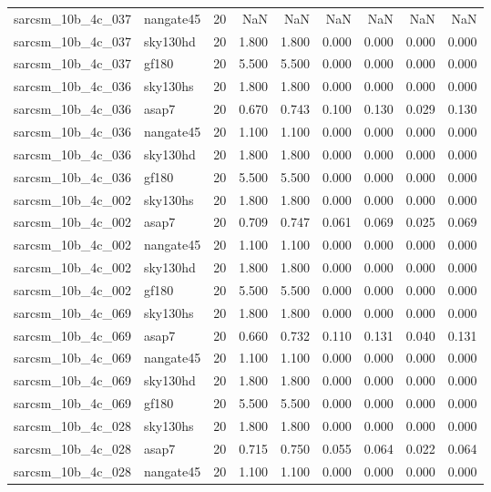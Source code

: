 \begin{tabular}{llrrrrrrr}
sarcsm\_10b\_4c\_037 & nangate45 & 20 & NaN & NaN & NaN & NaN & NaN & NaN \\
sarcsm\_10b\_4c\_037 & sky130hd & 20 & 1.800 & 1.800 & 0.000 & 0.000 & 0.000 & 0.000 \\
sarcsm\_10b\_4c\_037 & gf180 & 20 & 5.500 & 5.500 & 0.000 & 0.000 & 0.000 & 0.000 \\
sarcsm\_10b\_4c\_036 & sky130hs & 20 & 1.800 & 1.800 & 0.000 & 0.000 & 0.000 & 0.000 \\
sarcsm\_10b\_4c\_036 & asap7 & 20 & 0.670 & 0.743 & 0.100 & 0.130 & 0.029 & 0.130 \\
sarcsm\_10b\_4c\_036 & nangate45 & 20 & 1.100 & 1.100 & 0.000 & 0.000 & 0.000 & 0.000 \\
sarcsm\_10b\_4c\_036 & sky130hd & 20 & 1.800 & 1.800 & 0.000 & 0.000 & 0.000 & 0.000 \\
sarcsm\_10b\_4c\_036 & gf180 & 20 & 5.500 & 5.500 & 0.000 & 0.000 & 0.000 & 0.000 \\
sarcsm\_10b\_4c\_002 & sky130hs & 20 & 1.800 & 1.800 & 0.000 & 0.000 & 0.000 & 0.000 \\
sarcsm\_10b\_4c\_002 & asap7 & 20 & 0.709 & 0.747 & 0.061 & 0.069 & 0.025 & 0.069 \\
sarcsm\_10b\_4c\_002 & nangate45 & 20 & 1.100 & 1.100 & 0.000 & 0.000 & 0.000 & 0.000 \\
sarcsm\_10b\_4c\_002 & sky130hd & 20 & 1.800 & 1.800 & 0.000 & 0.000 & 0.000 & 0.000 \\
sarcsm\_10b\_4c\_002 & gf180 & 20 & 5.500 & 5.500 & 0.000 & 0.000 & 0.000 & 0.000 \\
sarcsm\_10b\_4c\_069 & sky130hs & 20 & 1.800 & 1.800 & 0.000 & 0.000 & 0.000 & 0.000 \\
sarcsm\_10b\_4c\_069 & asap7 & 20 & 0.660 & 0.732 & 0.110 & 0.131 & 0.040 & 0.131 \\
sarcsm\_10b\_4c\_069 & nangate45 & 20 & 1.100 & 1.100 & 0.000 & 0.000 & 0.000 & 0.000 \\
sarcsm\_10b\_4c\_069 & sky130hd & 20 & 1.800 & 1.800 & 0.000 & 0.000 & 0.000 & 0.000 \\
sarcsm\_10b\_4c\_069 & gf180 & 20 & 5.500 & 5.500 & 0.000 & 0.000 & 0.000 & 0.000 \\
sarcsm\_10b\_4c\_028 & sky130hs & 20 & 1.800 & 1.800 & 0.000 & 0.000 & 0.000 & 0.000 \\
sarcsm\_10b\_4c\_028 & asap7 & 20 & 0.715 & 0.750 & 0.055 & 0.064 & 0.022 & 0.064 \\
sarcsm\_10b\_4c\_028 & nangate45 & 20 & 1.100 & 1.100 & 0.000 & 0.000 & 0.000 & 0.000 \\

\end{tabular}
